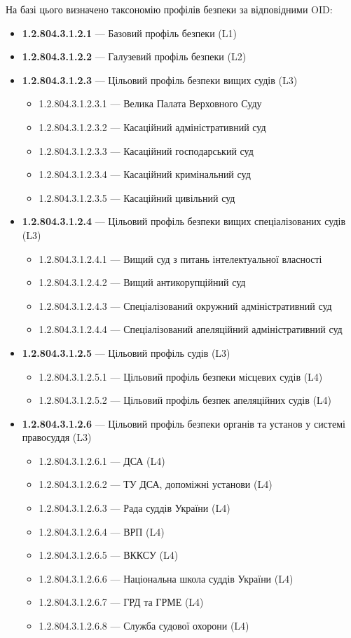 \documentclass{article}
\begin{document}
На базі цього визначено таксономію профілів безпеки за відповідними OID:
\begin{itemize}
    \item \textbf{1.2.804.3.1.2.1} — Базовий профіль безпеки (L1)
    \item \textbf{1.2.804.3.1.2.2} — Галузевий профіль безпеки (L2)
    \item \textbf{1.2.804.3.1.2.3} — Цільовий профіль безпеки вищих судів (L3)
    \begin{itemize}
        \item 1.2.804.3.1.2.3.1 — Велика Палата Верховного Суду
        \item 1.2.804.3.1.2.3.2 — Касаційний адміністративний суд
        \item 1.2.804.3.1.2.3.3 — Касаційний господарський суд
        \item 1.2.804.3.1.2.3.4 — Касаційний кримінальний суд
        \item 1.2.804.3.1.2.3.5 — Касаційний цивільний суд
    \end{itemize}
    \item \textbf{1.2.804.3.1.2.4} — Цільовий профіль безпеки вищих спеціалізованих судів (L3)
    \begin{itemize}
        \item 1.2.804.3.1.2.4.1 — Вищий суд з питань інтелектуальної власності
        \item 1.2.804.3.1.2.4.2 — Вищий антикорупційний суд
        \item 1.2.804.3.1.2.4.3 — Спеціалізований окружний адміністративний суд
        \item 1.2.804.3.1.2.4.4 — Спеціалізований апеляційний адміністративний суд
    \end{itemize}
    \item \textbf{1.2.804.3.1.2.5} — Цільовий профіль судів (L3)
    \begin{itemize}
        \item 1.2.804.3.1.2.5.1 — Цільовий профіль безпеки місцевих судів (L4)
        \item 1.2.804.3.1.2.5.2 — Цільовий профіль безпек апеляційних судів (L4)
    \end{itemize}
    \item \textbf{1.2.804.3.1.2.6} — Цільовий профіль безпеки органів та установ у системі правосуддя (L3)
    \begin{itemize}
        \item 1.2.804.3.1.2.6.1 — ДСА (L4)
        \item 1.2.804.3.1.2.6.2 — ТУ ДСА, допоміжні установи (L4)
        \item 1.2.804.3.1.2.6.3 — Рада суддів України (L4)
        \item 1.2.804.3.1.2.6.4 — ВРП (L4)
        \item 1.2.804.3.1.2.6.5 — ВККСУ (L4)
        \item 1.2.804.3.1.2.6.6 — Національна школа суддів України (L4)
        \item 1.2.804.3.1.2.6.7 — ГРД та ГРМЕ (L4)
        \item 1.2.804.3.1.2.6.8 — Служба судової охорони (L4)
    \end{itemize}
\end{itemize}
\end{document}
